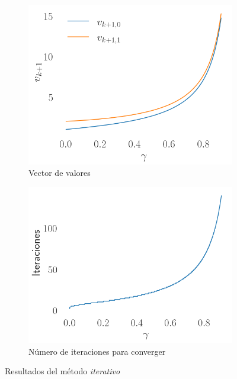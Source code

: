 \begin{figure}[H]
    \centering
    \begin{subfigure}[H]{0.45\textwidth}
        \includegraphics[width=\textwidth]{../img/gamma_v_k}
        \caption{Vector de valores}
        \label{fig:iter_gamma_vk}
    \end{subfigure}
    \begin{subfigure}[H]{0.45\textwidth}
        \includegraphics[width=\textwidth]{../img/gamma_iters}
        \caption{Número de iteraciones para converger}
        \label{fig:iter_gamma_iter}
    \end{subfigure}
    \caption{Resultados del método \textit{iterativo}}\label{fig:iter_gamma}
\end{figure}

